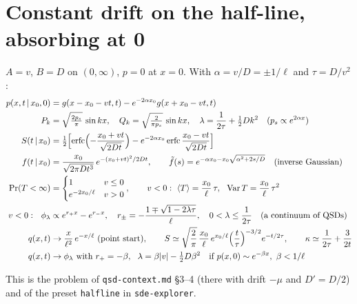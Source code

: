 \documentclass[11pt]{article}
\numberwithin{equation}{section}
\newcommand{\avg}[1]{\langle #1\rangle}
\newcommand{\given}{\,|\,}
\begin{document}
\section{Constant drift on the half-line, absorbing at 0}
\label{sec:drift-hl-absorbing}

\begin{keyresults}
$A=v$, $B=D$ on $(0,\infty)$, $p=0$ at $x=0$. With $\alpha=v/D=\pm1/\ell$ and $\tau=D/v^2$:
\begin{align}
  p(x,t\given x_0,0) &= g(x-x_0-vt,t)-e^{-2\alpha x_0}g(x+x_0-vt,t) \\
  P_k &= \sqrt{\tfrac{2p_s}{\pi}}\,\sin kx,\quad Q_k=\sqrt{\tfrac{2}{\pi p_s}}\,\sin kx,\quad
  \lambda=\frac1{2\tau}+\tfrac12Dk^2\quad(p_s\propto e^{2\alpha x}) \\
  S(t\given x_0) &= \tfrac12\Bigl[\operatorname{erfc}\Bigl(-\frac{x_0+vt}{\sqrt{2Dt}}\Bigr)
  -e^{-2\alpha x_0}\operatorname{erfc}\frac{x_0-vt}{\sqrt{2Dt}}\Bigr] \\
  f(t\given x_0) &= \frac{x_0}{\sqrt{2\pi Dt^3}}\,e^{-(x_0+vt)^2/2Dt},\qquad
  \tilde f(s)=e^{-\alpha x_0-x_0\sqrt{\alpha^2+2s/D}}\quad\text{(inverse Gaussian)} \\
  \Pr(T<\infty) &= \begin{cases}1 & v\le0\\ e^{-2x_0/\ell} & v>0\end{cases},\qquad
  v<0:\ \avg T=\frac{x_0}{\ell}\,\tau,\ \ \operatorname{Var}T=\frac{x_0}{\ell}\,\tau^2 \\
  v<0:\ \ \phi_\lambda &\propto e^{r_+x}-e^{r_-x},\quad r_\pm=-\frac{1\mp\sqrt{1-2\lambda\tau}}{\ell},
  \quad 0<\lambda\le\frac1{2\tau}\quad\text{(a continuum of QSDs)} \\
  q(x,t) &\to \frac{x}{\ell^2}\,e^{-x/\ell}\ \text{(point start)},\qquad
  S\simeq\sqrt{\frac2\pi}\,\frac{x_0}{\ell}\,e^{x_0/\ell}\Bigl(\frac t\tau\Bigr)^{-3/2}e^{-t/2\tau},\qquad
  \kappa\simeq\frac1{2\tau}+\frac3{2t} \\
  q(x,t) &\to \phi_\lambda\ \text{with }r_+=-\beta,\ \ \lambda=\beta|v|-\tfrac12D\beta^2
  \quad\text{if }p(x,0)\sim e^{-\beta x},\ \beta<1/\ell
\end{align}
\end{keyresults}

This is the problem of \texttt{qsd-context.md} \S3--4 (there with drift $-\mu$ and $D'=D/2$) and of the
preset \texttt{halfline} in \texttt{sde-explorer}.
\end{document}
